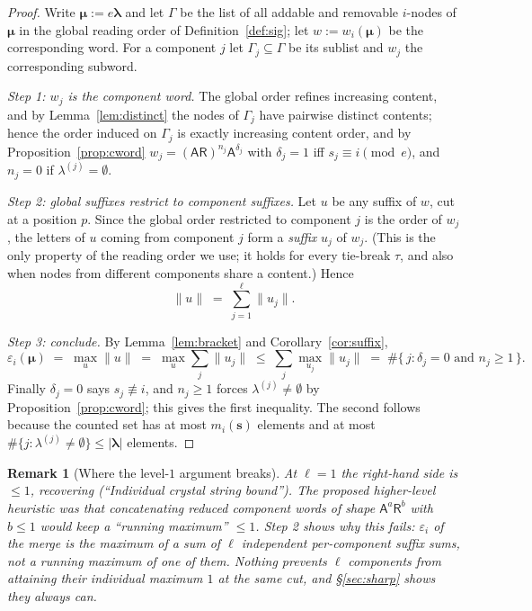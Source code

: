 \documentclass[11pt]{article}
\newtheorem{remark}[theorem]{Remark}
\theoremstyle{definition}
\newcommand{\eps}{\varepsilon}
\newcommand{\Aa}{{\mathsf A}}
\newcommand{\Rr}{{\mathsf R}}
\newcommand{\bs}{\mathbf{s}}
\newcommand{\blam}{\boldsymbol{\lambda}}
\newcommand{\bmu}{\boldsymbol{\mu}}
\begin{document}
\begin{proof}
Write $\bmu := e\blam$ and let $\Gamma$ be the list of all addable and
removable $i$-nodes of $\bmu$ in the global reading order of
Definition~\ref{def:sig}; let $w := w_i(\bmu)$ be the corresponding word.
For a component $j$ let $\Gamma_j \subseteq \Gamma$ be its sublist and
$w_j$ the corresponding subword.

\smallskip\noindent\emph{Step 1: $w_j$ is the component word.} The global
order refines increasing content, and by Lemma~\ref{lem:distinct} the
nodes of $\Gamma_j$ have pairwise distinct contents; hence the order
induced on $\Gamma_j$ is exactly increasing content order, and by
Proposition~\ref{prop:cword}
$w_j = (\Aa\Rr)^{n_j}\Aa^{\delta_j}$ with $\delta_j = 1$ iff
$s_j \equiv i \pmod e$, and $n_j = 0$ if $\lambda^{(j)} = \emptyset$.

\smallskip\noindent\emph{Step 2: global suffixes restrict to component
suffixes.} Let $u$ be any suffix of $w$, cut at a position $p$. Since the
global order restricted to component $j$ is the order of $w_j$, the
letters of $u$ coming from component $j$ form a \emph{suffix} $u_j$ of
$w_j$. (This is the only property of the reading order we use; it holds
for every tie-break $\tau$, and also when nodes from different components
share a content.) Hence
\[
  \|u\| \;=\; \sum_{j=1}^{\ell} \|u_j\| .
\]

\smallskip\noindent\emph{Step 3: conclude.} By Lemma~\ref{lem:bracket} and
Corollary~\ref{cor:suffix},
\[
  \eps_i(\bmu) \;=\; \max_{u} \|u\|
  \;=\; \max_{u} \sum_j \|u_j\|
  \;\le\; \sum_j \max_{u_j} \|u_j\|
  \;=\; \#\{\, j : \delta_j = 0 \text{ and } n_j \ge 1 \,\}.
\]
Finally $\delta_j = 0$ says $s_j \not\equiv i$, and $n_j \ge 1$ forces
$\lambda^{(j)} \ne \emptyset$ by Proposition~\ref{prop:cword}; this gives
the first inequality. The second follows because the counted set has at
most $m_i(\bs)$ elements and at most $\#\{j : \lambda^{(j)} \ne \emptyset\}
\le |\blam|$ elements.
\end{proof}

\begin{remark}[Where the level-$1$ argument breaks]\label{rmk:break}
At $\ell = 1$ the right-hand side is $\le 1$, recovering
\cite{Clio-C5-2026-08-11} (``Individual crystal string bound''). The proposed higher-level heuristic
was that concatenating reduced component words of shape $\Aa^a\Rr^b$ with
$b \le 1$ would keep a ``running maximum'' $\le 1$. Step 2 shows why this
fails: $\eps_i$ of the merge is the maximum of a \emph{sum} of $\ell$
independent per-component suffix sums, not a running maximum of one of
them. Nothing prevents $\ell$ components from attaining their individual
maximum $1$ at the same cut, and \S\ref{sec:sharp} shows they always can.
\end{remark}
\end{document}
